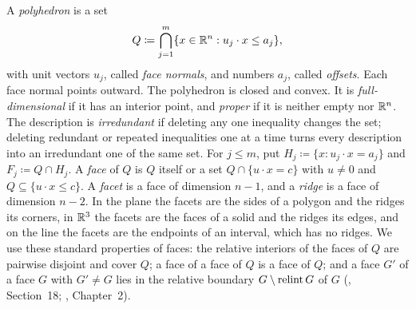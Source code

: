 \documentclass[11pt,letterpaper]{article}
\theoremstyle{plain}
\begin{document}
A \emph{polyhedron} is a set
\[
 Q\coloneqq \bigcap_{j=1}^m\{x\in\mathbb R^n:u_j\cdot x\le a_j\},
\]
with unit vectors \(u_j\), called \emph{face normals}, and numbers
\(a_j\), called \emph{offsets}. Each face normal points outward.
The polyhedron is closed and convex. It is
\emph{full-dimensional} if it has an interior point, and \emph{proper} if it
is neither empty nor \(\mathbb R^n\). The description is \emph{irredundant} if
deleting any one inequality changes the set; deleting redundant or repeated
inequalities one at a time turns every description into an irredundant one
of the same set. For \(j\le m\), put \(H_j\coloneqq \{x:u_j\cdot x=a_j\}\) and
\(F_j\coloneqq Q\cap H_j\). A \emph{face} of \(Q\) is \(Q\) itself or a set
\(Q\cap\{u\cdot x=c\}\) with \(u\ne0\) and \(Q\subseteq\{u\cdot x\le c\}\).
A \emph{facet} is a face of dimension \(n-1\), and a \emph{ridge} is a face
of dimension \(n-2\). In the plane the facets are the sides of a polygon
and the ridges its corners, in \(\mathbb R^3\) the facets are the faces of a solid
and the ridges its edges, and on the line the facets are the endpoints of an
interval, which has no ridges. We use these standard properties of faces:
the relative interiors of the faces of \(Q\) are pairwise disjoint and cover
\(Q\); a face of a face of \(Q\) is a face of \(Q\); and a face \(G'\)
of a face \(G\) with \(G'\ne G\) lies in the relative boundary
\(G\setminus\operatorname{relint} G\) of \(G\) (, Section~18; , Chapter~2).
\end{document}
